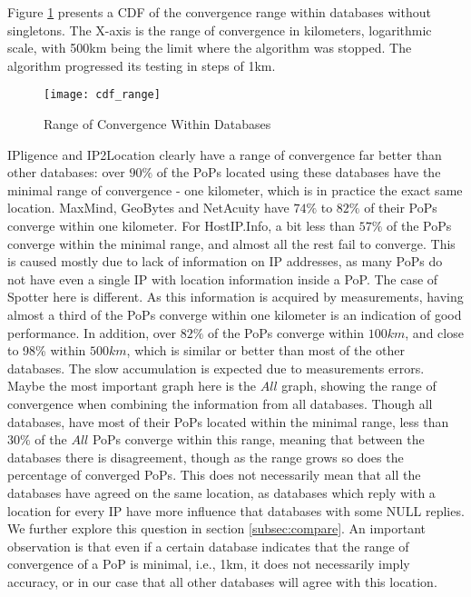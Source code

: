 Figure \ref{fig:cdf_range} presents a CDF of the convergence range
within databases without singletons. The X-axis is the range of
convergence in kilometers, logarithmic scale, with 500km being the
limit where the algorithm was stopped. The algorithm progressed its
testing in steps of 1km.
\begin{figure}
\begin{minipage}[b]{\linewidth}
\centering
\texttt{[image: cdf\_range]}
\caption{Range of Convergence Within Databases}
\label{fig:cdf_range}
\end{minipage}
\end{figure}


IPligence and IP2Location clearly have a range of convergence far
better than other databases: over $90\%$ of the PoPs located using
these databases have the minimal range of convergence - one
kilometer, which is in practice the exact same location. MaxMind,
GeoBytes and NetAcuity have $74\%$ to $82\%$ of their PoPs converge
within one kilometer. For HostIP.Info, a bit less than $57\%$ of the
PoPs converge within the minimal range, and almost all the rest fail
to converge. This is caused mostly due to lack of information on IP
addresses, as many PoPs do not have even a single IP with location
information inside a PoP. The case of Spotter here is different. As
this information is acquired by measurements, having almost a third
of the PoPs converge within one kilometer is an indication of good
performance. In addition, over $82\%$ of the PoPs converge within
$100km$, and close to 98\% within $500km$, which is similar or
better than most of the other databases. The slow accumulation is
expected due to measurements errors. Maybe the most important graph
here is the $All$ graph, showing the range of convergence when
combining the information from all databases. Though all databases,
have most of their PoPs located within the minimal range, less than
$30\%$ of the $All$ PoPs converge within this range, meaning that
between the databases there is disagreement, though as the range
grows so does the percentage of converged PoPs. This does not
necessarily mean that all the databases have agreed on the same
location, as databases which reply with a location for every IP have
more influence that databases with some NULL replies. We further
explore this question in section \ref{subsec:compare}. An important
observation is that even if a certain database indicates that the
range of convergence of a PoP is minimal, i.e., 1km, it does not
necessarily imply accuracy, or in our case that all other databases
will agree with this location.



